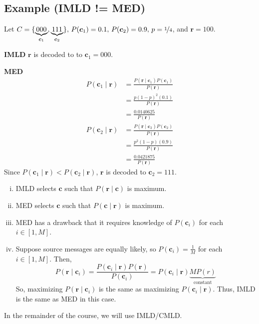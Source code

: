 \begin{exbox}
    \subsection{Example (IMLD != MED)}
    Let $ C=\{\underbrace{000}_{\bm{c}_1},\underbrace{111}_{\bm{c}_2}\},\,
    P(\bm{c}_1)=0.1,\, P(\bm{c}_2)=0.9,\, p=\nicefrac{1}{4} $, and $ \bm{r}=100 $.

    \textbf{IMLD} $ \bm{r} $ is decoded to to $ \bm{c}_1 = 000 $.

    \textbf{MED}
    \begin{align*}
        P(\bm{c}_1\mid \bm{r})
        &=\frac{P(\bm{r}\mid \bm{c}_1)P(\bm{c}_1)}{P(\bm{r})}\\
        &=\frac{p(1-p)^2(0.1)}{P(\bm{r})}\\
        &=\frac{0.0140625}{P(\bm{r})} 
    \end{align*}
    \begin{align*}
        P(\bm{c}_2\mid \bm{r})
        &=\frac{P(\bm{r}\mid \bm{c}_2)P(\bm{c}_2)}{P(\bm{r})}\\
        &=\frac{p^2(1-p)(0.9)}{P(\bm{r})}\\
        &=\frac{0.0421875}{P(\bm{r})} 
    \end{align*}
    Since $ P(\bm{c}_1\mid \bm{r})<P(\bm{c}_2\mid \bm{r}) $,
    $ \bm{r} $ is decoded to $ \bm{c}_2=111 $.
\end{exbox}

\begin{enumerate}[(i)]
    \item IMLD selects $ \bm{c} $ such that $ P(\bm{r}\mid \bm{c}) $ is maximum.
    \item MED selects $ \bm{c} $ such that $ P(\bm{c}\mid \bm{r}) $ is maximum.
    \item MED has a drawback that it requires knowledge of $ P(\bm{c}_i) $ for
    each $ i\in [1,M] $.
    \item Suppose source messages are equally likely, so
    $ P(\bm{c}_i)=\frac{1}{M} $ for each $ i\in[1,M] $.
    Then,
    \[ P(\bm{r}\mid \bm{c}_i)=\frac{P(\bm{c}_i\mid \bm{r})P(\bm{r})}{P(\bm{c}_i)}
    =P(\bm{c}_i\mid \bm{r}) \underbrace{M P(r)}_{\text{constant}}\]
    So, maximizing $ P(\bm{r}\mid \bm{c}_i) $ is the same as maximizing
    $ P(\bm{c}_i\mid \bm{r}) $. Thus, IMLD is the same as MED in this case.
\end{enumerate}
In the remainder of the course, we will use IMLD/CMLD.